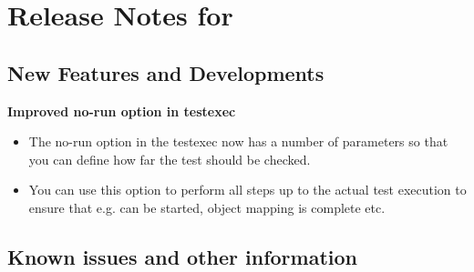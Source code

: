 \makeatletter
\section{Release Notes for \@bxversion}
\makeatother

\subsection{New Features and Developments}

\textbf{Improved no-run option in testexec}
\begin{itemize}
\item The no-run option in the testexec now has a number of parameters so that you can define how far the test should be checked. 
\item You can use this option to perform all steps up to the actual test execution to ensure that e.g. \gdauts{} can be started, object mapping is complete etc.
\end{itemize}



\subsection{Known issues and other information}
